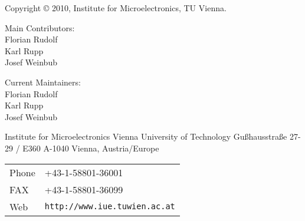 
\clearpage

Copyright {\copyright} 2010, Institute for Microelectronics, TU Vienna.

\vspace{2.5cm}

Main Contributors:\\ 

Florian Rudolf\\
Karl Rupp\\
Josef Weinbub\\

\vspace{2.5cm}

Current Maintainers: \\

Florian Rudolf\\
Karl Rupp\\
Josef Weinbub\\


\vspace{7.0cm}

Institute for Microelectronics\newline
Vienna University of Technology\newline
Gu\ss hausstra\ss e 27-29 / E360\newline
A-1040 Vienna, Austria/Europe\newline


\begin{tabular}{ll}
Phone  & +43-1-58801-36001\\
FAX    & +43-1-58801-36099\\
Web    & \texttt{http://www.iue.tuwien.ac.at}
\end{tabular}



